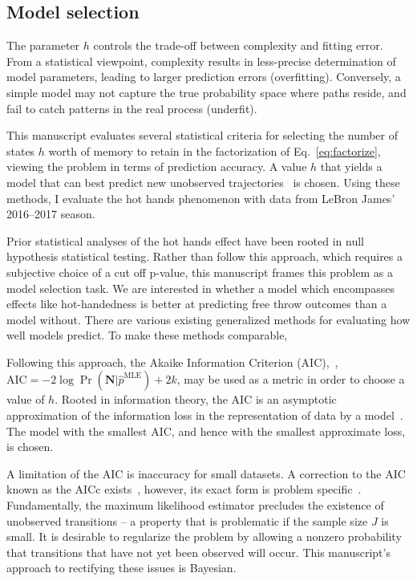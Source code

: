 \documentclass{IOS-Book-Article}
\newcommand{\bN}{\mathbf{N}}
\begin{document}
\subsection{Model selection}

The parameter $h$ controls the trade-off between complexity and fitting error. From a statistical viewpoint, complexity results in less-precise determination of model parameters, leading to larger prediction errors (overfitting). Conversely, a simple model may not capture the true probability space where paths reside, and fail to catch patterns in the real process (underfit).



This manuscript evaluates several statistical criteria for selecting the number of states $h$ worth of memory to retain in the factorization of Eq.~\ref{eq:factorize}, viewing the problem in terms of prediction accuracy. 
A value $h$ that yields a model that can best predict new unobserved trajectories~\cite{claeskens2008model} is chosen. Using these methods, I evaluate the hot hands phenomenon
with data from LeBron James' 2016--2017 season.


Prior statistical analyses of the hot hands effect have been rooted in null hypothesis statistical testing. Rather than follow this
approach, which requires a subjective choice of a cut off p-value, this manuscript frames this problem as a model selection task.
We are interested in whether a model which encompasses effects like hot-handedness is better at predicting free throw outcomes
than a model without. There are various existing generalized methods for evaluating how well models predict. To make these
methods comparable, 

Following this approach, the Akaike Information Criterion (AIC),~\cite{akaike1974new,tong1975determination,katz1981some}, $\textrm{AIC}=-2\log\Pr(\bN\vert \hat{p}^{\textrm{MLE}})+2k$,
 may be used as a metric in order to choose a value of $h$.  Rooted in information theory, the AIC is an asymptotic approximation of the information loss in the representation of data by a model~\cite{burnham2003model}. The model with the smallest AIC, and hence with the smallest approximate loss, is chosen.

A limitation of the AIC is inaccuracy for small datasets. A correction to the AIC known as the AICc exists~\cite{hurvich1989regression}, however, its exact form is problem specific~\cite{burnham2003model}. Fundamentally, the maximum likelihood estimator precludes the existence of unobserved transitions -- a property that is problematic if  the sample size $J$ is small.
It is desirable to regularize the problem by allowing a nonzero probability that
transitions that have not yet been observed will occur. This manuscript's approach to rectifying these issues is Bayesian.
\end{document}
